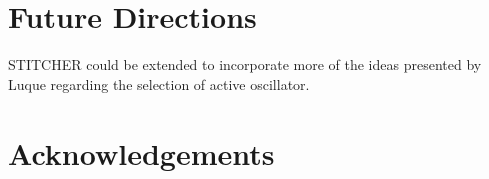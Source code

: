 \documentclass[10pt]{article}
\begin{document}
\section{Future Directions}
STITCHER could be extended to incorporate more of the ideas presented by Luque regarding the selection of active oscillator.


\section{Acknowledgements}

\pagebreak


\end{document}
